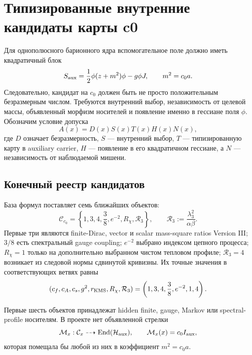 \chapter{Типизированные внутренние кандидаты карты c0}
\label{ch:v8-baryon-c0-typed-internal-map-candidate-audit-gate}

Для однополюсного барионного ядра вспомогательное поле должно иметь
квадратичный блок
\begin{equation}
 S_{\rm aux}=\frac12\phi(z+m^2)\phi-g\phi J,
 \qquad m^2=c_0a.
 \label{eq:v8-baryon-c0-required-auxiliary-block}
\end{equation}
Следовательно, кандидат на $c_0$ должен быть не просто положительным
безразмерным числом. Требуются внутренний выбор, независимость от целевой
массы, объявленный морфизм носителей и появление именно в гессиане поля
$\phi$. Обозначим условие допуска
\begin{equation}
 A(x)=D(x)S(x)T(x)H(x)N(x),
 \label{eq:v8-baryon-c0-admission-predicate}
\end{equation}
где $D$ означает безразмерность, $S$ --- внутренний выбор, $T$ ---
типизированную карту в auxiliary carrier, $H$ --- появление в его
квадратичном гессиане, а $N$ --- независимость от наблюдаемой мишени.

\section{Конечный реестр кандидатов}

База формул поставляет семь ближайших объектов:
\begin{equation}
 \mathcal C_{c_0}=
 \left\{1,3,4,\frac38,e^{-2},R_\chi,\mathcal R_3\right\},
 \qquad
 \mathcal R_3:=\frac{\lambda_3^2}{\alpha\beta}.
 \label{eq:v8-baryon-c0-candidate-set}
\end{equation}
Первые три являются finite-Dirac, vector и scalar mass-square ratios
Version III; $3/8$ есть спектральный gauge coupling; $e^{-2}$ выбрано
индексом цепного процесса; $R_\chi=1$ только на дополнительно выбранном
чистом тепловом профиле; $\mathcal R_3=4$ возникает из следовой нормы
сдвинутой кривизны. Их точные значения в соответствующих ветвях равны
\begin{equation}
 (c_f,c_A,c_s,g^2,r_{\rm KMS},R_\chi,\mathcal R_3)
 =\left(1,3,4,\frac38,e^{-2},1,4\right).
 \label{eq:v8-baryon-c0-candidate-values}
\end{equation}

Первые шесть объектов принадлежат hidden finite, gauge, Markov или
spectral-profile носителям. В проекте нет объявленной стрелки
\begin{equation}
 \mathcal M_x:\mathcal C_x
 \dashrightarrow
 \operatorname{End}(\mathcal H_{\rm aux}),
 \qquad
 \mathcal M_x(x)=c_0I_{\rm aux},
 \label{eq:v8-baryon-c0-missing-carrier-map}
\end{equation}
которая помещала бы любой из них в коэффициент $m^2=c_0a$.

